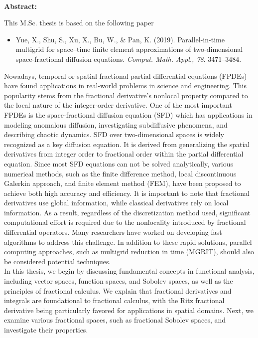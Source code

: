\noindent
\hrulefill
\\
\textbf{Abstract:}
\\
{
\small 
This M.Sc. thesis is based on the following paper
\begin{itemize}%
\item
Yue, X., Shu, S., Xu, X., Bu, W., \& Pan, K.
(2019).
Parallel-in-time multigrid for space–time finite element approximations of two-dimensional space-fractional diffusion equations.
\textit{Comput. Math. Appl., 78}.
3471–3484.
\end{itemize}
Nowadays, temporal or spatial fractional partial differential equations (FPDEs) have found applications in real-world problems in science and engineering. 
This popularity stems from the fractional derivative's nonlocal property compared to the local nature of the integer-order derivative. 
One of the most important FPDEs is the space-fractional diffusion equation (SFD) which has applications in modeling anomalous diffusion, investigating subdiffusive phenomena, and describing chaotic dynamics.
SFD over two-dimensional spaces is widely recognized as a key diffusion equation. 
It is derived from generalizing the spatial derivatives from integer order to fractional order within the partial differential equation. 
Since most SFD equations can not be solved analytically, various numerical methods, such as the finite difference method, local discontinuous Galerkin approach, and finite element method (FEM), have been proposed to achieve both high accuracy and efficiency.
It is important to note that fractional derivatives use global information, while classical derivatives rely on local information. 
As a result, regardless of the discretization method used, significant computational effort is required due to the nonlocality introduced by fractional differential operators. 
Many researchers have worked on developing fast algorithms to address this challenge. 
In addition to these rapid solutions, parallel computing approaches, such as multigrid reduction in time (MGRIT), should also be considered potential techniques. 
\\
In this thesis, we begin by discussing fundamental concepts in functional analysis, including vector spaces, function spaces, and Sobolev spaces, as well as the principles of fractional calculus. 
We explain that fractional derivatives and integrals are foundational to fractional calculus, with the Ritz fractional derivative being particularly favored for applications in spatial domains. 
Next, we examine various fractional spaces, such as fractional Sobolev spaces, and investigate their properties.
}
